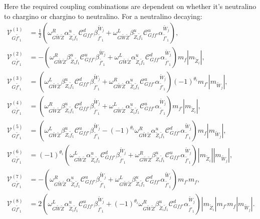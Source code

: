 \documentclass[final,3p,times]{elsarticle}
\begin{document}
Here the required coupling combinations are dependent on whether it's
neutralino to chargino or chargino to neutralino. For a neutralino decaying:
\begin{align}
\mathcal{V}_{G \tilde{f'}_1}^{(1)} &= \frac{1}{2}(\omega_{G \tilde{W} \tilde{Z}}^R   \alpha_{\tilde{Z}_i \tilde{f}_1}^{u}  \mathcal{C}_{G f f'}^d  \beta_{\tilde{f'}_1}^{\tilde{W}_j} +  \omega_{G \tilde{W} \tilde{Z}}^L  \beta_{\tilde{Z}_i \tilde{f}_1}^{u}  \mathcal{C}_{G f f'}^u  \alpha_{\tilde{f'}_1}^{\tilde{W}_j}), \\
\mathcal{V}_{G \tilde{f'}_1}^{(2)} &= -(\omega_{G \tilde{W} \tilde{Z}}^R   \beta_{\tilde{Z}_i \tilde{f}_1}^{u}  \mathcal{C}_{G f f'}^u  \beta_{\tilde{f'}_1}^{\tilde{W}_j} +  \omega_{G \tilde{W} \tilde{Z}}^L  \alpha_{\tilde{Z}_i \tilde{f}_1}^{u}  \mathcal{C}_{G f f'}^d  \alpha_{\tilde{f'}_1}^{\tilde{W}_j})m_{f}|m_{\tilde{Z}_i}|, \\
\mathcal{V}_{G \tilde{f'}_1}^{(3)} &= (\omega_{G \tilde{W} \tilde{Z}}^L  \beta_{\tilde{Z}_i \tilde{f}_1}^{u}  \mathcal{C}_{G f f'}^d  \beta_{\tilde{f'}_1}^{\tilde{W}_j} +  \omega_{G \tilde{W} \tilde{Z}}^R  \alpha_{\tilde{Z}_i \tilde{f}_1}^{u}  \mathcal{C}_{G f f'}^u  \alpha_{\tilde{f'}_1}^{\tilde{W}_j})(-1)^{\theta_i} m_{f'}|m_{\tilde{W}_j}|, \\
\mathcal{V}_{G \tilde{f'}_1}^{(4)} &= (\omega_{G \tilde{W} \tilde{Z}}^R   \beta_{\tilde{Z}_i \tilde{f}_1}^{u}  \mathcal{C}_{G f f'}^d  \beta_{\tilde{f'}_1}^{\tilde{W}_j} +  \omega_{G \tilde{W} \tilde{Z}}^L  \alpha_{\tilde{Z}_i \tilde{f}_1}^{u}  \mathcal{C}_{G f f'}^u  \alpha_{\tilde{f'}_1}^{\tilde{W}_j})m_{f'}|m_{\tilde{Z}_i}|, \\
\mathcal{V}_{G \tilde{f'}_1}^{(5)} &= (\omega_{G \tilde{W} \tilde{Z}}^L \beta_{\tilde{Z}_i \tilde{f}_1}^{u}  \mathcal{C}_{G f f'}^u  \beta_{\tilde{f'}_1}^{\tilde{W}_j} -  (-1)^{\theta_i} \omega_{G \tilde{W} \tilde{Z}}^R  \alpha_{\tilde{Z}_i \tilde{f}_1}^{u}  \mathcal{C}_{G f f'}^d  \alpha_{\tilde{f'}_1}^{\tilde{W}_j})m_{f} |m_{\tilde{W}_j}|,\\
\mathcal{V}_{G \tilde{f'}_1}^{(6)} &= (-1)^{\theta_i}(\omega_{G \tilde{W} \tilde{Z}}^L   \alpha_{\tilde{Z}_i \tilde{f}_1}^{u}  \mathcal{C}_{G f f'}^d  \beta_{\tilde{f'}_1}^{\tilde{W}_j} + \omega_{G \tilde{W} \tilde{Z}}^R  \beta_{\tilde{Z}_i \tilde{f}_1}^{u}  \mathcal{C}_{G f f'}^u  \alpha_{\tilde{f'}_1}^{\tilde{W}_j})|m_{\tilde{Z}_i}||m_{\tilde{W}_j}| ,\\
\mathcal{V}_{G \tilde{f'}_1}^{(7)} &= -(\omega_{G \tilde{W} \tilde{Z}}^R   \alpha_{\tilde{Z}_i \tilde{f}_1}^{u}  \mathcal{C}_{G f f'}^u  \beta_{\tilde{f'}_1}^{\tilde{W}_j} +  \omega_{G \tilde{W} \tilde{Z}}^L  \beta_{\tilde{Z}_i \tilde{f}_1}^{u}  \mathcal{C}_{G f f'}^d  \alpha_{\tilde{f'}_1}^{\tilde{W}_j})m_{f'}m_{f}, \\
\mathcal{V}_{G \tilde{f'}_1}^{(8)} &= 2(\omega_{G \tilde{W} \tilde{Z}}^L   \alpha_{\tilde{Z}_i \tilde{f}_1}^{u}  \mathcal{C}_{G f f'}^u  \beta_{\tilde{f'}_1}^{\tilde{W}_j} + (-1)^{\theta_i}\omega_{G \tilde{W} \tilde{Z}}^R  \beta_{\tilde{Z}_i \tilde{f}_1}^{u}  \mathcal{C}_{G f f'}^d  \alpha_{\tilde{f'}_1}^{\tilde{W}_j})|m_{\tilde{Z}_i}|m_{f'}m_{f}|m_{\tilde{W}_j}|.
\end{align}
\end{document}
